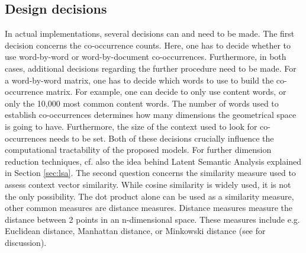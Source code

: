 

\subsection{Design decisions}
\label{sec:dist-design}

In actual implementations, several decisions can and need to be
made. The first decision concerns the co-occurrence counts. Here, one
has to decide whether to use word-by-word or word-by-document
co-occurrences. Furthermore, in both cases, additional decisions regarding the further procedure
need to be made. For a word-by-word matrix, one has to decide which words to use to build the co-occurrence matrix. For example, one can decide to only use content words, or only the
10,000 most common content words. The number of words used to
establish co-occurrences determines how many dimensions the
geometrical space is going to have. Furthermore, the size of the
context used to look for co-occurrences needs to be set. Both of these
decisions crucially influence the computational tractability of the
proposed models. For further dimension reduction techniques, cf. also
the idea behind Latent Semantic Analysis explained in Section \ref{sec:lsa}.
The second question concerns the similarity measure used to
assess context vector similarity. While cosine similarity is widely
used, it is not the only possibility. The dot product alone
can be used as a similarity measure, other common measures are
distance measures. Distance measures measure the distance between
2 points in an n-dimensional space. These measures include e.g. Euclidean distance, Manhattan distance, or Minkowski distance (see
 \citealt[34--35]{Sahlgren:2006} for
discussion). 

